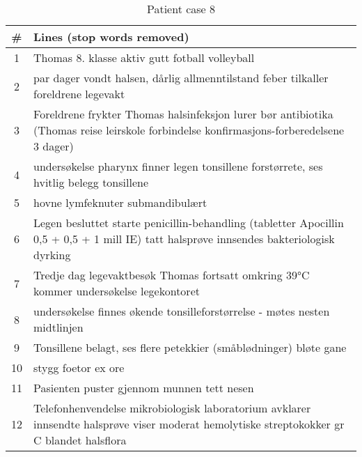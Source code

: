 \begin{table}[htbp] \footnotesize \center
\caption{Patient case 8\label{tab:pcase8}}
\begin{tabularx}{\textwidth}{c X}
    \toprule
    \# & Lines (stop words removed) \\
    \midrule
	1 & Thomas 8. klasse aktiv gutt fotball volleyball \\
	2 & par dager vondt halsen, dårlig allmenntilstand feber tilkaller foreldrene legevakt \\
	3 & Foreldrene frykter Thomas halsinfeksjon lurer bør antibiotika (Thomas reise leirskole forbindelse konfirmasjons-forberedelsene 3 dager) \\
	4 & undersøkelse pharynx finner legen tonsillene forstørrete, ses hvitlig belegg tonsillene \\
	5 & hovne lymfeknuter submandibulært \\
	6 & Legen besluttet starte penicillin-behandling (tabletter Apocillin 0,5 + 0,5 + 1 mill IE) tatt halsprøve innsendes bakteriologisk dyrking \\
	7 & Tredje dag legevaktbesøk Thomas fortsatt omkring 39°C kommer undersøkelse legekontoret \\
	8 & undersøkelse finnes økende tonsilleforstørrelse - møtes nesten midtlinjen \\
	9 & Tonsillene belagt, ses flere petekkier (småblødninger) bløte gane \\
	10 & stygg foetor ex ore \\
	11 & Pasienten puster gjennom munnen tett nesen \\
	12 & Telefonhenvendelse mikrobiologisk laboratorium avklarer innsendte halsprøve viser moderat hemolytiske streptokokker gr C blandet halsflora \\
	\bottomrule
\end{tabularx}
\end{table}


